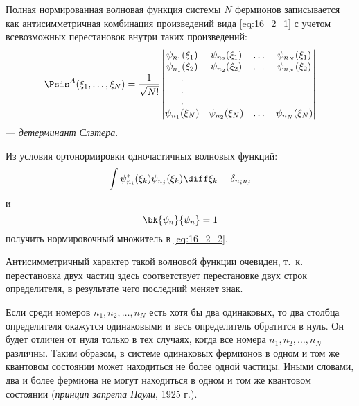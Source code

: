 Полная нормированная волновая функция системы $N$ фермионов записывается как антисимметричная комбинация произведений вида \eqref{eq:16_2_1} с учетом всевозможных перестановок внутри таких произведений:
\begin{equation}
\label{eq:16_2_2}
\Psis^A(\xi_1, \dots, \xi_N) = \frac{1}{\sqrt{N!}} \left |
  \begin{matrix} 
  \psi_{n_1}(\xi_1) & \psi_{n_2}(\xi_1) & \dots &  \psi_{n_N}(\xi_1) \\
  \psi_{n_1}(\xi_2) & \psi_{n_2}(\xi_2) & \dots &  \psi_{n_N}(\xi_2) \\
  .                                &                                  &    &                                    \\
  .                                &                                  &    &                                    \\
  .                                &                                  &    &                                    \\
  \psi_{n_1}(\xi_N) & \psi_{n_2}(\xi_N) & \dots &  \psi_{n_N}(\xi_N)
  \end{matrix} \right |
\end{equation}
--- {\em детерминант Слэтера}\footnotemark{}.
%
\begin{excr}

Из условия ортонормировки одночастичных волновых функций: 
$$
\int \psi_{n_i}^*(\xi_k) \psi_{n_j}(\xi_k) \diff\xi_k = \delta_{n_i n_j}
$$
и 
$$
\bk{\psi_n}{\psi_n} = 1
$$
получить нормировочный множитель в \eqref{eq:16_2_2}.
\end{excr}

Антисимметричный характер такой волновой функции очевиден, т.~к. перестановка двух частиц здесь соответствует перестановке двух строк определителя, в результате чего последний меняет знак.

Если среди номеров $n_1, n_2, \dots, n_N$ есть хотя бы два одинаковых, то два столбца определителя окажутся одинаковыми и весь определитель обратится в нуль. Он будет отличен от нуля только в тех случаях, когда все номера $n_1, n_2, \dots, n_N$ различны. Таким образом, в системе одинаковых фермионов в одном и том же квантовом состоянии может находиться не более одной частицы. Иными словами, два и более фермиона не могут находиться в одном и том же квантовом состоянии ({\em принцип запрета Паули}, 1925 г.).
